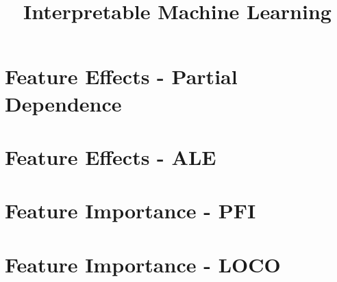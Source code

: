 \documentclass[11pt,compress,t,notes=noshow, aspectratio=169, xcolor=table]{beamer}
\title{Interpretable Machine Learning}
\date{}
\begin{document}

% 

% 


\section{Feature Effects - Partial Dependence}





\section{Feature Effects - ALE}
%






\section{Feature Importance - PFI}






%


\section{Feature Importance - LOCO}

\end{document}
